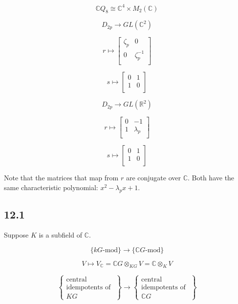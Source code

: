 \documentclass{article}
\theoremstyle{definition}
\begin{document}
\[
    \mathbb{C} Q_8 \cong \mathbb{C}^4 \times M_2(\mathbb{C})
\]

\[
    D_{2p} \to GL(\mathbb{C}^2)
\]

\[
    r \mapsto \begin{bmatrix}
        \zeta_p &  0 \\
        0 &  \zeta_p ^{-1} \\
    \end{bmatrix}
\]

\[
    s \mapsto \begin{bmatrix}
        0 &  1 \\
        1 &  0 \\
    \end{bmatrix}
\]

\[
    D_{2p} \to GL(\mathbb{R}^2)
\]

\[
    r \mapsto \begin{bmatrix}
        0 &  -1 \\
        1 &  \lambda_p \\
    \end{bmatrix}
\]

\[
    s \mapsto \begin{bmatrix}
        0 &  1 \\
        1 &  0 \\
    \end{bmatrix}
\]

Note that the matrices that map from \(r\) are conjugate over \(\mathbb{C}\). Both have the same characteristic polynomial: \(x^2 - \lambda_p x + 1\).

\subsection*{12.1}

Suppose \(K\) is a subfield of \(\mathbb{C}\).

\[
    \{ kG\text{-mod} \} \to \{ \mathbb{C} G\text{-mod} \} 
\]

\[
    V \mapsto V_\mathbb{C} = \mathbb{C} G \otimes_{KG} V = \mathbb{C} \otimes_K V
\]

\[
    \begin{Bmatrix} \text{central} \\ \text{idempotents of } \\ KG \end{Bmatrix} \to \begin{Bmatrix} \text{central} \\ \text{idempotents of } \\ \mathbb{C} G  \end{Bmatrix}
\]
\end{document}
